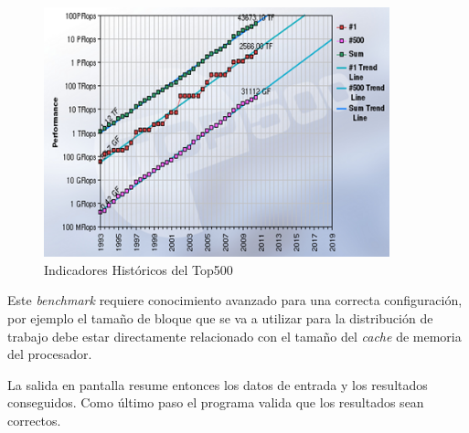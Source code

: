 \documentclass[a4paper]{report}
\begin{document}
\begin{figure}[H]
\begin{center}
\includegraphics[width=10cm]{top500.png}
\caption{Indicadores Hist\'oricos del Top500}
\end{center}
\end{figure}

Este {\it benchmark} requiere conocimiento avanzado para una correcta configuraci\'on,
por ejemplo el tama\~no de bloque que se va a utilizar para la distribuci\'on de trabajo
debe estar directamente relacionado con el tama\~no del {\it cache} de memoria del procesador.

\bigskip

La salida en pantalla resume entonces los datos de entrada y los resultados conseguidos.
Como \'ultimo paso el programa valida que los resultados sean correctos.
\end{document}
